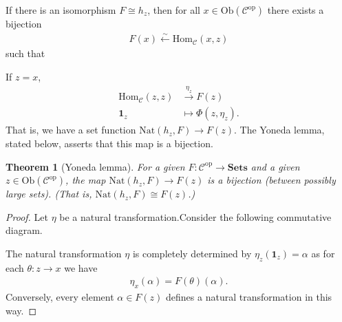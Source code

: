 \documentclass[12pt]{report}
\theoremstyle{plain}
\newtheorem{theorem}{Theorem}[section]
\theoremstyle{remark}
\theoremstyle{definition}
\newcommand{\Hom}[3]{\mathrm{Hom}_{#3}(#1,#2)}
\begin{document}
If there is an isomorphism $F\cong h_z$, then for all $x\in\mathrm{Ob}(\mathcal{C}^\mathrm{op})$ there exists a bijection
\begin{align*}
    F(x) \stackrel{\sim}{\longleftarrow} \Hom{x}{z}{\mathcal{C}}
\end{align*}
such that
\begin{figure}[H]
\centering
{}
\end{figure}
If $z=x$,
\begin{align*}
    \Hom{z}{z}{\mathcal{C}} &\stackrel{\eta_z}{\rightarrow} F(z)  \\
    \mathbf{1}_z &\mapsto \Phi(z, \eta_z).
\end{align*}
That is, we have a set function $\mathrm{Nat}(h_z,F)\rightarrow F(z)$. The Yoneda lemma, stated below, asserts that this map is a bijection.

\begin{theorem}[Yoneda lemma]
    For a given $F:\mathcal{C}^\mathrm{op}\rightarrow\mathbf{Sets}$ and a given $z\in\mathrm{Ob}(\mathcal{C}^\mathrm{op})$, the map $\mathrm{Nat}(h_z,F)\rightarrow F(z)$ is a bijection (between possibly large sets). (That is, $\mathrm{Nat}(h_z,F)\cong F(z)$.)
\end{theorem}
\begin{proof}
    Let $\eta$ be a natural transformation.Consider the following commutative diagram.
    \begin{figure}[H]
    \centering
    \end{figure}
    \noindent The natural transformation $\eta$ is completely determined by $\eta_z(\mathbf{1}_z)=\alpha$ as for each $\theta:z\rightarrow x$ we have
    \begin{align*}
        \eta_x(\alpha) = F(\theta)(\alpha).
    \end{align*}
    Conversely, every element $\alpha\in F(z)$ defines a natural transformation in this way.
\end{proof}
\end{document}
